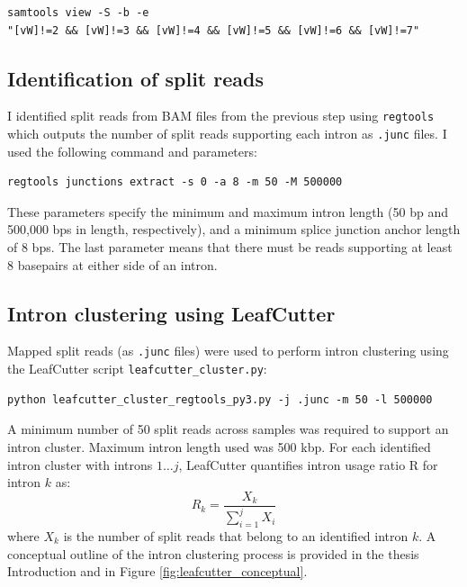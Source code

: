 \begin{verbatim}
samtools view -S -b -e 
"[vW]!=2 && [vW]!=3 && [vW]!=4 && [vW]!=5 && [vW]!=6 && [vW]!=7"
\end{verbatim}

\subsection{Identification of split reads}
I identified split reads from BAM files from the previous step using \Verb_regtools_ \cite{Cotto2023-yp} which outputs the number of split reads supporting each intron as \Verb_.junc_ files. I used the following command and parameters:
\begin{verbatim}regtools junctions extract -s 0 -a 8 -m 50 -M 500000 \end{verbatim}
These parameters specify the minimum and maximum intron length (50 bp and 500,000 bps in length, respectively), and a minimum splice junction anchor length of 8 bps. The last parameter means that there must be reads supporting at least 8 basepairs at either side of an intron. 

\subsection{Intron clustering using LeafCutter}
Mapped split reads (as \Verb_.junc_ files) were used to perform intron clustering using the LeafCutter script \Verb+leafcutter_cluster.py+:

\begin{verbatim}
python leafcutter_cluster_regtools_py3.py -j .junc -m 50 -l 500000
\end{verbatim}
A minimum number of 50 split reads across samples was required to support an intron cluster. Maximum intron length used was 500 kbp. 
For each identified intron cluster with introns $1…j$, LeafCutter quantifies intron usage ratio R for intron $k$ as:
$$R_{k}=\frac{X_k}{ \sum_{i=1}^{j}X_{i} }$$
where $X_k$ is the number of split reads that belong to an identified intron $k$. A conceptual outline of the intron clustering process is provided in the thesis Introduction and in Figure \ref{fig:leafcutter_conceptual}.

